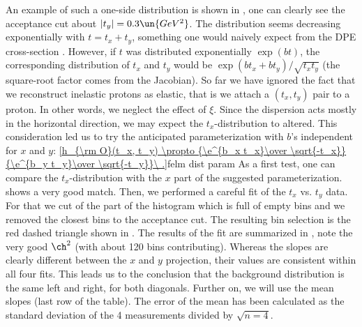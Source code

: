 An example of such a one-side distribution is shown in , one can clearly see the acceptance cut about $|t_y| = 0.3\un{GeV^2}$. The distribution seems decreasing exponentially with $t = t_x + t_y$, something one would naively expect from the DPE cross-section . However, if $t$ was distributed exponentially $\exp(b t)$, the corresponding distribution of $t_x$ and $t_y$ would be $\exp(b t_x + b t_y)/\sqrt{t_x t_y}$ (the square-root factor comes from the Jacobian). So far we have ignored the fact that we reconstruct inelastic protons as elastic, that is we attach a $(t_x, t_y)$ pair to a proton. In other words, we neglect the effect of $\xi$. Since the dispersion acts mostly in the horizontal direction, we may expect the $t_x$-distribution to altered. This consideration led us to try the anticipated parameterization with $b$'s independent for $x$ and $y$:
\eqref{h_{\rm O}(t_x, t_y) \propto {\e^{b_x t_x}\over \sqrt{-t_x}} {\e^{b_y t_y}\over \sqrt{-t_y}}\ .}{felm dist param}
As a first test, one can compare the $t_x$-distribution with the $x$ part of the suggested parameterization.  shows a very good match. Then, we performed a careful fit of the $t_x$ vs. $t_y$ data. For that we cut of the part of the histogram which is full of empty bins and we removed the closest bins to the acceptance cut. The resulting bin selection is the red dashed triangle shown in . The results of the fit are summarized in , note the very good $\ch^2$ (with about 120 bins contributing). Whereas the slopes are clearly different between the $x$ and $y$ projection, their values are consistent within all four fits. This leads us to the conclusion that the background distribution is the same left and right, for both diagonals. Further on, we will use the mean slopes (last row of the table). The error of the mean has been calculated as the standard deviation of the 4 measurements divided by $\sqrt{n = 4}$.


